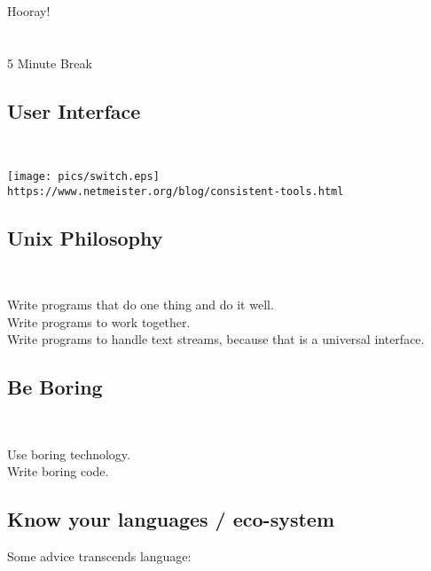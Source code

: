 \documentclass[xga]{xdvislides}
\begin{document}
\newpage
\vspace*{\fill}
\begin{center}
    \Hugesize
        Hooray! \\ [1em]
    \hspace*{5mm}
    \blueline\\
    \hspace*{5mm}\\
        5 Minute Break
\end{center}
\vspace*{\fill}

\subsection{User Interface}
\\
\vspace*{\fill}
\begin{center}
	\texttt{[image: pics/switch.eps]} \\
\vspace{.5in}
\verb+https://www.netmeister.org/blog/consistent-tools.html+
\end{center}
\vspace*{\fill}


\subsection{Unix Philosophy}
\\
\Huge
\begin{center}
	Write programs that do one thing and do it well.\\
	\vspace{.5in}
	Write programs to work together. \\
	\vspace{.5in}
	Write programs to handle text streams, because that is a universal interface.
\end{center}
\Normalsize

\subsection{Be Boring}
\\
\Huge
\begin{center}
	Use boring technology. \\
\vspace{1in}
	Write boring code.
\end{center}
\Normalsize

\subsection{Know your languages / eco-system}
Some advice transcends language: \\
\end{document}

